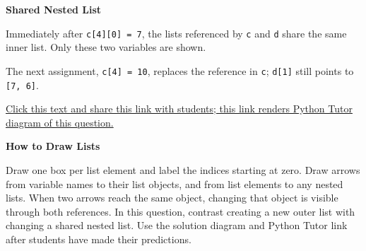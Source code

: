 \begin{solution}[0in]
\begin{blocksection}
\textbf{Shared Nested List}

Immediately after \lstinline{c[4][0] = 7}, the lists referenced by
\lstinline{c} and \lstinline{d} share the same inner list. Only these
two variables are shown.
\begin{center}
\end{center}
The next assignment, \lstinline{c[4] = 10}, replaces the reference
in \lstinline{c}; \lstinline{d[1]} still points to \lstinline{[7, 6]}.

\href{https://pythontutor.com/visualize.html#code=a%20%3D%20%5B1,%202,%203%5D%0Aa%0Aa%5B2%5D%0Aa%5B-1%5D%0A%0Ab%20%3D%20a%0Aa%20%3D%20a%20%2B%20%5B4,%20%5B5,%206%5D%5D%0Aa%0Ab%0A%0Ac%20%3D%20a%0Aa%20%3D%20%5B4,%205%5D%0Aa%0Ac%0A%0Ad%20%3D%20c%5B3%3A5%5D%0Ac%5B3%5D%20%3D%209%0Ad%0A%0Ac%5B4%5D%5B0%5D%20%3D%207%0Ad%0A%0Ac%5B4%5D%20%3D%2010%0Ad%0Ac&mode=edit&origin=opt-frontend.js&py=311}{Click this text and share this link with students; this link renders Python Tutor diagram of this question.}
\end{blocksection}
\end{solution}

\begin{meta}
\noindent
\begin{blocksection}
\textbf{How to Draw Lists}

Draw one box per list element and label the indices starting at zero. Draw arrows from variable names to their list objects, and from list elements to any nested lists. When two arrows reach the same object, changing that object is visible through both references. In this question, contrast creating a new outer list with changing a shared nested list. Use the solution diagram and Python Tutor link after students have made their predictions.
\end{blocksection}\par
\end{meta}

